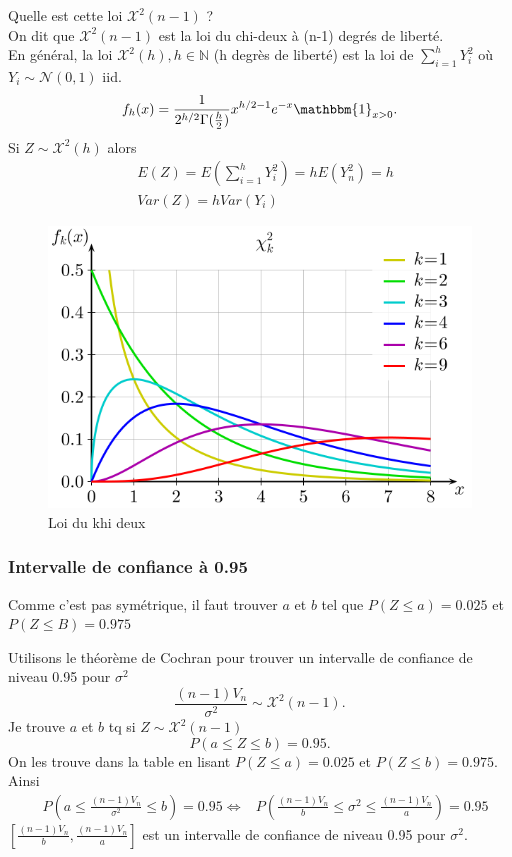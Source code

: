 \documentclass{article}
\theoremstyle{plain}%
\theoremstyle{definition}
\theoremstyle{remark}
\begin{document}
Quelle est cette loi $ \mathcal{X}^2(n-1) $ ? \\
On dit que $ \mathcal{X}^2(n-1) $ est la loi du chi-deux à (n-1) degrés de liberté. \\
En général, la loi $ \mathcal{X}^2(h), h \in \mathbb{N} $ (h degrès de liberté) est la loi de $ \sum_{i=1}^{h}Y_i^2 $ où $ Y_i \sim \mathcal{N}(0,1) $ iid.
\[
    f_h(x) = \frac{1}{2^{h/2} \Gamma (\frac{h}{2})} x^{h/2 -1 } e^{-x} \mathbbm{1}_{x>0}
.\]
Si $ Z \sim \mathcal{X}^2(h) $ alors
\begin{align*}
    &E(Z) = E(\sum_{i=1}^{h}Y_i^2) = hE(Y_n^2) = h \\
    &Var(Z) = h Var(Y_i)
\end{align*}
\begin{figure}[!htbp]
    \centering
    \includegraphics*[width=.5\textwidth]{./figures/Chi-square_pdf.png}
    \caption{Loi du khi deux}
\end{figure}

\subsubsection{Intervalle de confiance à 0.95}

Comme c'est pas symétrique, il faut trouver $ a $ et $ b $ tel que $ P(Z \leq a) = 0.025 $ et $ P(Z \leq B) = 0.975 $ 

Utilisons le théorème de Cochran pour trouver un intervalle de confiance de niveau 0.95 pour $ \sigma ^2 $ 
\[
    \frac{(n-1) V_n}{\sigma ^2} \sim \mathcal{X}^2(n-1)
.\]
Je trouve $ a $ et $ b $ tq si $ Z \sim \mathcal{X}^2 (n-1) $ 
\[
    P(a \leq Z \leq b) = 0.95
.\]
On les trouve dans la table en lisant $ P(Z \leq a) = 0.025 $ et $ P(Z \leq b) = 0.975 $. Ainsi 
\begin{align*}
    & P(a \leq \frac{(n-1) V_n}{\sigma ^2} \leq b) = 0.95
    \Leftrightarrow & P(\frac{(n-1) V_n}{b} \leq \sigma ^2 \leq \frac{(n-1) V_n}{a}) = 0.95
\end{align*}
$ [\frac{(n-1) V_n}{b}, \frac{(n-1) V_n}{a}] $ est un intervalle de confiance de niveau 0.95 pour $ \sigma ^2 $.
\end{document}
